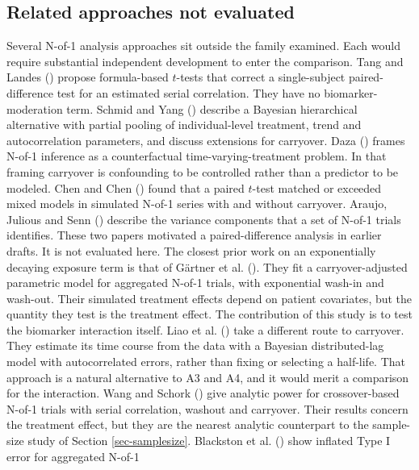 \documentclass[
  11pt,
]{article}
\begin{document}
\subsection{Related approaches not evaluated}\label{sec-related}

Several N-of-1 analysis approaches sit outside the family examined.
Each would require substantial independent development to enter the
comparison. Tang and Landes () propose formula-based
\(t\)-tests that correct a single-subject paired-difference test for
an estimated serial correlation. They have no biomarker-moderation
term. Schmid and Yang () describe a Bayesian
hierarchical alternative with partial pooling of individual-level
treatment, trend and autocorrelation parameters, and discuss
extensions for carryover. Daza
() frames N-of-1 inference as a counterfactual
time-varying-treatment problem. In that framing carryover is
confounding to be controlled rather than a predictor to be modeled.
Chen and Chen () found that a paired \(t\)-test matched or
exceeded mixed models in simulated N-of-1 series with and without
carryover. Araujo, Julious and Senn () describe the
variance components that a set of N-of-1 trials identifies. These
two papers motivated a paired-difference analysis in earlier drafts.
It is not evaluated here. The closest prior work on an exponentially
decaying exposure term is that of Gärtner et al. (). They
fit a carryover-adjusted parametric model for aggregated N-of-1
trials, with exponential wash-in and wash-out. Their simulated
treatment effects depend on patient covariates, but the quantity they
test is the treatment effect. The contribution of this study is to
test the biomarker interaction itself. Liao et
al. () take a different route to carryover. They estimate
its time course from the data with a Bayesian distributed-lag model
with autocorrelated errors, rather than fixing or selecting a
half-life. That approach is a natural alternative to A3 and A4, and
it would merit a comparison for the interaction. Wang and Schork
() give analytic power for crossover-based N-of-1 trials
with serial correlation, washout and carryover. Their results concern
the treatment effect, but they are the nearest analytic counterpart
to the sample-size study of Section \ref{sec-samplesize}. Blackston et
al. () show inflated Type I error for aggregated N-of-1
\end{document}
